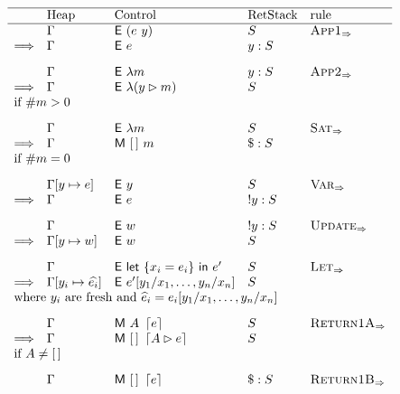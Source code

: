 \begin{figure*}
  \[
    \begin{array}{rllll} \hline
      & \text{Heap} & \text{Control} & \text{RetStack} & \text{rule} \\ \hline
      & \Gamma & \eval (e~\loc) & \retstack  & \smallrule{App1} \\
      \Longrightarrow & \Gamma & \eval e  & \loc:\retstack    \\[2ex]
      & \Gamma & \eval \lambda m & \loc:\retstack & \smallrule{App2} \\
      \Longrightarrow & \Gamma & \eval \lambda (\matcharg{\loc}{m}) & \retstack\\
      \multicolumn{5}{l}{\text{if}~\arity{m}>0} \\[2ex]
      & \Gamma & \eval \lambda m & \retstack & \smallrule{Sat} \\
      \Longrightarrow & \Gamma & \match{[\,]}{m} & \$:\retstack  \\
      \multicolumn{5}{l}{\text{if}~ \arity{m}=0}\\[2ex]
      & \Gamma[\loc\mapsto e] & \eval \loc & \retstack & \smallrule{Var} \\
      \Longrightarrow & \Gamma & \eval e  & !\loc : \retstack &   \\[2ex]
      & \Gamma  & \eval w  & !\loc : \retstack  & \smallrule{Update}  \\
      \Longrightarrow & \Gamma[\loc\mapsto w] & \eval w   & \retstack & \\[2ex]
      & \Gamma & \eval \llet{\{x_i=e_i\}}{e'}  & \retstack & \smallrule{Let} \\
      \Longrightarrow & \Gamma[\loc_i\mapsto \widehat{e_i}] & \eval e'[\loc_1/x_1,\ldots,\loc_n/x_n]   & \retstack \\
      \multicolumn{5}{l}{\text{where}~\loc_i~\text{are fresh and}~ %
      \widehat{e}_i = e_i[\loc_1/x_1,\ldots,\loc_n/x_n]}   \\[2ex]
      & \Gamma & \match {\argstack}{\matchreturn{e}} & \retstack &  \smallrule{Return1A} \\
      \Longrightarrow & \Gamma & \match{[\,]}{\matchreturn{\matcharg{A}{e}}} & \retstack & \\
      \multicolumn{5}{l}{\text{if}~\argstack \neq [\,]} \\[2ex]
      & \Gamma & \match {[\,]}{\matchreturn{e}} & \$:\retstack &  \smallrule{Return1B} \\

\end{array}\]
\end{figure*}
